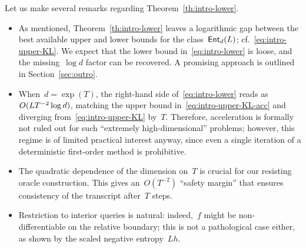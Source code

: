 \documentclass[11pt]{article}
\numberwithin{equation}{section}
\theoremstyle{remark}
\newcommand{\odima}[1]{{\color{magenta}#1}}
\newcommand{\ri}{\operatorname{ri}}
\newcommand{\Ent}{\textup{\textsf{Ent}}}
\newcommand{\Fh}{\Ent_d}
\newcommand{\Simp}{\Delta_d}
\newcommand{\1}{\mathbf{1}}
\begin{document}
Let us make several remarks regarding Theorem~\ref{th:intro-lower}. 
%
\begin{itemize}
\item[R1.] As mentioned, Theorem~\ref{th:intro-lower} leaves a logarithmic gap between the best available upper and lower bounds for the class~$\Fh(L)$; cf.~\eqref{eq:intro-upper-KL}. 
We expect that the lower bound in~\eqref{eq:intro-lower} is loose, and the missing~$\log d$ factor can be recovered.
A promising approach is outlined in Section~\ref{sec:outro}.

\item[R2.] When~$d = \exp(T)$, the right-hand side of~\eqref{eq:intro-lower} reads as~$O(\smash{{LT^{-2} \log d}})$, matching the upper bound in~\eqref{eq:intro-upper-KL-acc} and diverging from~\eqref{eq:intro-upper-KL} by~$T$.  Therefore, acceleration is formally not ruled out for such ``extremely high-dimensional'' problems; however, this regime is of limited practical interest anyway, since even a single iteration of a deterministic first-order method is prohibitive.

\item[R3.] The quadratic dependence of the dimension on~$T$  is crucial for our resisting oracle construction.
This gives an~$O(T^{-2})$ ``safety margin'' that ensures consistency of the transcript after~$T$ steps.

\item[R4.] Restriction to interior queries is natural: indeed,~$f$ might be non-differentiable on the relative boundary; this is not a pathological case either, as shown by the scaled negative entropy~$Lh$.
\vspace{-0.1cm}
\end{itemize}
\end{document}
